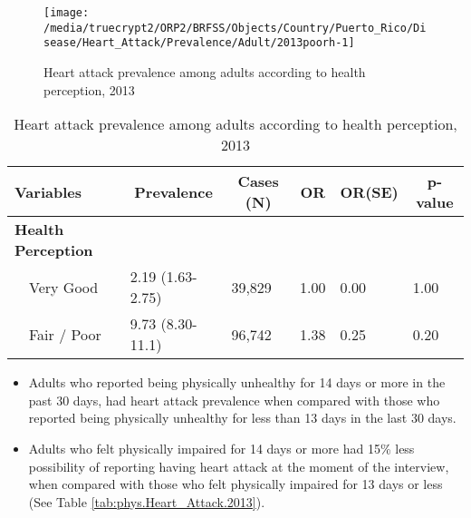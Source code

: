 \begin{figure}[H]
\caption{Heart attack prevalence among adults according to health perception,
         2013}
\label{fig:fairpoor.Heart_Attack.2013}

\begin{knitrout}
\color{fgcolor}

{\centering \texttt{[image: /media/truecrypt2/ORP2/BRFSS/Objects/Country/Puerto\_Rico/Disease/Heart\_Attack/Prevalence/Adult/2013poorh-1]} 

}



\end{knitrout}
 \end{figure}

\begin{table}[H]
\caption{Heart attack prevalence  among adults according to health perception, 2013\label{tab:fairpoor.Heart_Attack.2013}} 
\begin{center}
\begin{tabular}{llllll}
\hline\hline
\multicolumn{1}{l}{Variables}&\multicolumn{1}{c}{Prevalence}&\multicolumn{1}{c}{Cases (N)}&\multicolumn{1}{c}{OR}&\multicolumn{1}{c}{OR(SE)}&\multicolumn{1}{c}{p-value}\tabularnewline
\hline
{\bfseries Health Perception}&&&&&\tabularnewline
~~Very Good&2.19 (1.63-2.75)&39,829&1.00&0.00&1.00\tabularnewline
~~Fair / Poor&9.73 (8.30-11.1)&96,742&1.38&0.25&0.20\tabularnewline
\hline
\end{tabular}\end{center}

\end{table}

 
\newpage

 \newpage
\begin{itemize}

\item Adults who reported being physically unhealthy for 14 days or more in the past 30 days, had
 heart attack prevalence when compared with 
those who reported being physically unhealthy for less than 13 days in the last 30 days.


\item Adults who felt physically impaired for 14 days or more had 15\% less possibility of reporting having heart attack at the moment of the interview, when compared with those who felt physically impaired for 13 days or less (See Table \ref{tab:phys.Heart_Attack.2013}).

\end{itemize}

